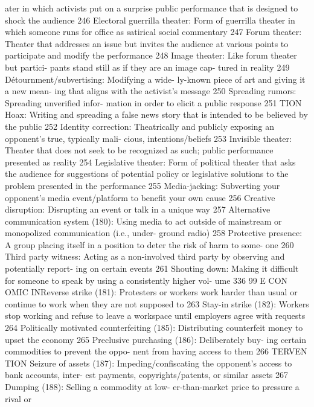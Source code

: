 \documentclass[twoside,a4paper,12pt,fleqn,openany]{extbook}
\begin{document}
ater in which activists put on a surprise public
performance that is designed to shock the
audience
 246
Electoral guerrilla theater: Form of guerrilla
theater in which someone runs for office as
satirical social commentary
 247
Forum theater: Theater that addresses an issue
but invites the audience at various points to
participate and modify the performance 248
Image theater: Like forum theater but partici-
pants stand still as if they are an image cap-
tured in reality
 249
Détournment/subvertising: Modifying a wide-
ly-known piece of art and giving it a new mean-
ing that aligns with the activist’s message 250
Spreading rumors: Spreading unverified infor-
mation in order to elicit a public response 251
TION
Hoax: Writing and spreading a false news
story that is intended to be believed by the
public
 252
Identity correction: Theatrically and publicly
exposing an opponent’s true, typically mali-
cious, intentions/beliefs
 253
Invisible theater: Theater that does not seek
to be recognized as such; public performance
presented as reality
 254
Legislative theater: Form of political theater
that asks the audience for suggestions of
potential policy or legislative solutions to the
problem presented in the performance 255
Media-jacking: Subverting your opponent’s
media event/platform to benefit your own
cause
 256
Creative disruption: Disrupting an event or talk
in a unique way
 257
Alternative communication system (180):
Using media to act outside of mainstream or
monopolized communication (i.e., under-
ground radio)
 258
Protective presence: A group placing itself in
a position to deter the risk of harm to some-
one
 260
Third party witness: Acting as a non-involved
third party by observing and potentially report-
ing on certain events
 261
Shouting down: Making it difficult for someone
to speak by using a consistently higher vol-
ume
 336
99
E CON OMIC INReverse strike (181): Protesters or workers
work harder than usual or continue to work
when they are not supposed to
 263
Stay-in strike (182): Workers stop working and
refuse to leave a workspace until employers
agree with requests
 264
Politically motivated counterfeiting (185):
Distributing counterfeit money to upset the
economy
 265
Preclusive purchasing (186): Deliberately buy-
ing certain commodities to prevent the oppo-
nent from having access to them
 266
TERVEN TION
Seizure of assets (187): Impeding/confiscating
the opponent’s access to bank accounts, inter-
est payments, copyrights/patents, or similar
assets
 267
Dumping (188): Selling a commodity at low-
er-than-market price to pressure a rival or
\end{document}
